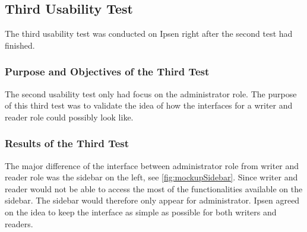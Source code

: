 \documentclass[../../master.tex]{subfiles}
\begin{document}
\subsection{Third Usability Test}\label{thirdtest}
The third usability test was conducted on Ipsen right after the second test had finished.

\subsubsection*{Purpose and Objectives of the Third Test}
The second usability test only had focus on the administrator role.
The purpose of this third test was to validate the idea of how the interfaces for a writer and reader role could possibly look like.

\subsubsection*{Results of the Third Test}
The major difference of the interface between administrator role from writer and reader role was the sidebar on the left, see \cref{fig:mockupSidebar}.
Since writer and reader would not be able to access the most of the functionalities available on the sidebar.
The sidebar would therefore only appear for administrator.
Ipsen agreed on the idea to keep the interface as simple as possible for both writers and readers.
\end{document}
